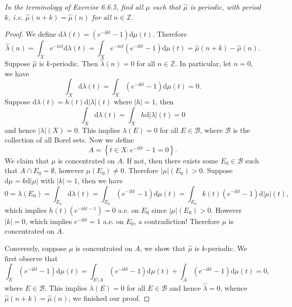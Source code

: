 \begin{problem}\em
In the terminology of Exercise 6.6.5, find all $\mu$ such that $\widehat{\mu}$ is periodic, with period $k$, i.e. $\widehat{\mu}(n+k)=\widehat{\mu}(n)$ for all $n\in\mathbb{Z}$.
\end{problem}
\begin{proof}
We define $\mathrm{d}\lambda \left( t \right) =\left( e^{-\mathrm{i}kt}-1 \right) \mathrm{d}\mu \left( t \right) $. Therefore 
$$
\widehat{\lambda }\left( n \right) =\int_X{e^{-\mathrm{i}nt}\mathrm{d}\lambda \left( t \right)}=\int_X{e^{-\mathrm{i}nt}\left( e^{-\mathrm{i}kt}-1 \right) \mathrm{d}\mu \left( t \right)}=\widehat{\mu }\left( n+k \right) -\widehat{\mu }\left( n \right) .
$$
Suppose $\widehat{\mu}$ is $k$-periodic. Then $\widehat{\lambda}(n)=0$ for all $n\in\mathbb{Z}$. In particular, let $n=0$, we have 
$$
\int_X{\mathrm{d}\lambda \left( t \right)}=\int_X{\left( e^{-\mathrm{i}kt}-1 \right) \mathrm{d}\mu \left( t \right)}=0.
$$
Suppose $\mathrm{d}\lambda(t)=h(t)\mathrm{d}|\lambda|(t)$ where $|h|=1$, then 
$$
\int_X{\mathrm{d}\lambda \left( t \right)}=\int_X{h\mathrm{d}\left| \lambda \right|\left( t \right)}=0
$$
and hence $|\lambda|(X)=0$. This implies $\lambda(E)=0$ for all $E\in\mathcal{B}$, where $\mathcal{B}$ is the collection of all Borel sets. Now we define 
$$
A=\left\{ t\in X:e^{-\mathrm{i}kt}-1=0 \right\} .
$$
We claim that $\mu$ is concentrated on $A$. If not, then there exists some $E_0\in\mathcal{B}$ such that $A\cap E_0=\emptyset$, however $\mu(E_0)\ne 0$. Therefore $|\mu|(E_0)>0$. Suppose $\mathrm{d}\mu=k\mathrm{d}|\mu|$ with $|k|=1$, then we have 
$$
0=\lambda \left( E_0 \right) =\int_{E_0}{\mathrm{d}\lambda \left( t \right)}=\int_{E_0}{\left( e^{-\mathrm{i}kt}-1 \right) \mathrm{d}\mu \left( t \right)}=\int_{E_0}{k\left( t \right) \left( e^{-\mathrm{i}kt}-1 \right) \mathrm{d}\left| \mu \right|\left( t \right)},
$$
which implies $h(t)(e^{-\mathrm{i}kt-1})=0$ a.e. on $E_0$ since $|\mu|(E_0)>0$. However $|k|=0$, which implies $e^{-\mathrm{i}kt}=1$ a.e. on $E_0$, a contradiction! Therefore $\mu$ is concentrated on $A$.\par
Conversely, suppose $\mu$ is concentrated on $A$, we show that $\widehat{\mu}$ is $k$-periodic. We first observe that 
$$
\int_E{\left( e^{-\mathrm{i}kt}-1 \right) \mathrm{d}\mu \left( t \right)}=\int_{E\setminus A}{\left( e^{-\mathrm{i}kt}-1 \right) \mathrm{d}\mu \left( t \right)}+\int_A{\left( e^{-\mathrm{i}kt}-1 \right) \mathrm{d}\mu \left( t \right)}=0,
$$
where $E\in\mathcal{B}$. This implies $\lambda(E)=0$ for all $E\in\mathcal{B}$ and hence $\widehat{\lambda}=0$, whence $\widehat{\mu}(n+k)=\widehat{\mu}(n)$, we finished our proof.
\end{proof}
